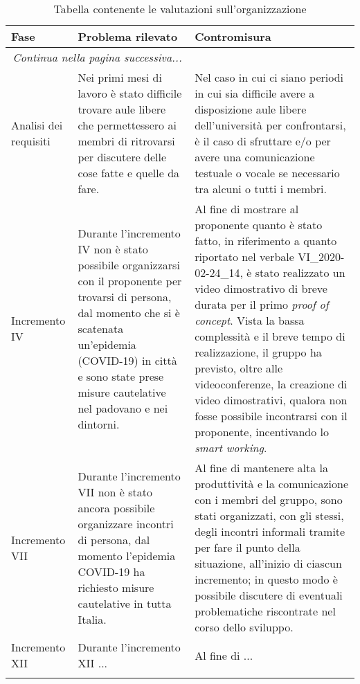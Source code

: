 		\begin{center}
			\begin{longtable}{|p{3cm}|p{6cm}|p{6cm}|}
				\hline
				\rowcolor{lighter-grayer}
				\textbf{Fase} & \textbf{Problema rilevato} & \textbf{Contromisura}\\
				\hline
				\endfirsthead
				\hline
		        \multicolumn{2}{|c|}{\textit{Continua nella pagina successiva...}}\\
		        \hline
		        \endfoot
		        \endlastfoot
		        
		        \hline
		        Analisi dei requisiti
		        &
		        Nei primi mesi di lavoro è stato difficile trovare aule libere che permettessero ai membri di ritrovarsi per discutere delle cose fatte e quelle da fare.
		        &
		        Nel caso in cui ci siano periodi in cui sia difficile avere a disposizione aule libere dell'università per confrontarsi, è il caso di sfruttare \glock{Slack} e/o \glock{Discord} per avere una comunicazione testuale o vocale se necessario tra alcuni o tutti i membri. \\
		        \hline
		        
				Incremento IV
				&
				Durante l'incremento IV non è stato possibile organizzarsi con il proponente per trovarsi di persona, dal momento che si è scatenata un'epidemia (COVID-19) in città e sono state prese misure cautelative nel padovano e nei dintorni.
			  	&
		 		Al fine di mostrare al proponente quanto è stato fatto, in riferimento a quanto riportato nel verbale VI\_2020-02-24\_14, è stato realizzato un video dimostrativo di breve durata per il primo \textit{proof of concept}. Vista la bassa complessità e il breve tempo di realizzazione, il gruppo ha previsto, oltre alle videoconferenze, la creazione di video dimostrativi, qualora non fosse possibile incontrarsi con il proponente, incentivando lo \textit{smart working}.  \\
				\hline

				Incremento VII
				&
				Durante l'incremento VII non è stato ancora possibile organizzare incontri di persona, dal momento l'epidemia COVID-19 ha richiesto misure cautelative in tutta Italia.
			  	&
		 		Al fine di mantenere alta la produttività e la comunicazione con i membri del gruppo, sono stati organizzati, con gli stessi, degli incontri informali tramite \glock{Discord} per fare il punto della situazione, all'inizio di ciascun incremento; in questo modo è possibile discutere di eventuali problematiche riscontrate nel corso dello sviluppo.  \\
				\hline
				
				Incremento XII
				&
				Durante l'incremento XII ...
				&
				Al fine di ... \\
				\hline
				\caption{Tabella contenente le valutazioni sull'organizzazione}
        
			\end{longtable}
		\end{center}

